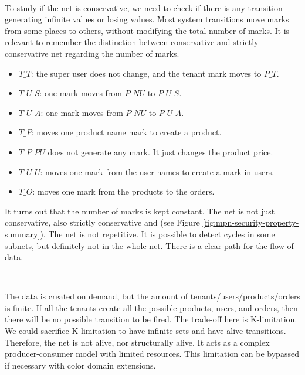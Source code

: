 \documentclass[12pt,english]{article} %
\begin{document}
\


To study if the net is conservative, we need to check if there is any transition generating infinite values or losing values.
Most system transitions move marks from some places to others, without modifying the total number of marks.
It is relevant to remember the distinction between conservative and strictly conservative net regarding the number of marks.

\begin{itemize}
    \item $T\_T$: the super user does not change, and the tenant mark moves to $P\_T$.
    \item $T\_U\_S$: one mark moves from $P\_NU$ to $P\_U\_S$.
    \item $T\_U\_A$: one mark moves from $P\_NU$ to $P\_U\_A$.
    \item $T\_P$: moves one product name mark to create a product.
    \item $T\_P\_PU$ does not generate any mark. It just changes the product price.
    \item $T\_U\_U$: moves one mark from the user names to create a mark in users.
    \item $T\_O$: moves one mark from the products to the orders.
\end{itemize}

It turns out that the number of marks is kept constant.
The net is not just conservative, also strictly conservative and (see Figure \ref{fig:mpn-security-property-summary}).
The net is not repetitive.
It is possible to detect cycles in some subnets, but definitely not in the whole net.
There is a clear path for the flow of data.

\

The data is created on demand, but the amount of tenants/users/products/orders is finite.
If all the tenants create all the possible products, users, and orders, then there will be no possible transition to be fired.
The trade-off here is K-limitation. We could sacrifice K-limitation to have infinite sets and have alive transitions.
Therefore, the net is not alive, nor structurally alive.
It acts as a complex producer-consumer model with limited resources.
This limitation can be bypassed if necessary with color domain extensions.
\end{document}
